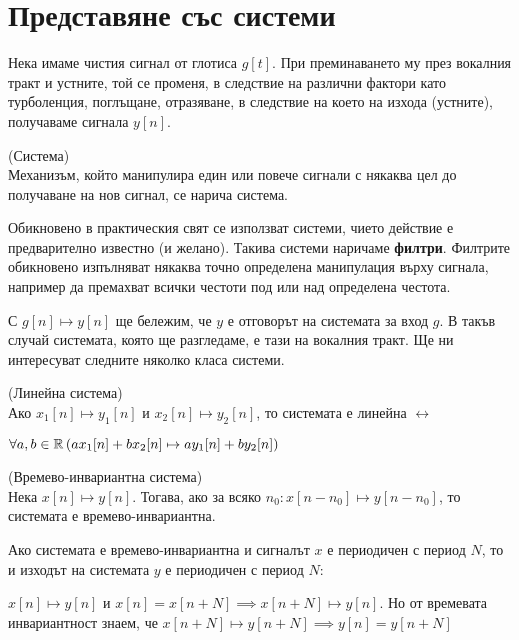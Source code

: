 \documentclass[main.tex]{subfiles}
\begin{document}
\section{Представяне със системи}
Нека имаме чистия сигнал от глотиса $g[t]$. При преминаването му през вокалния тракт и устните, той
се променя, в следствие на различни фактори като турболенция, поглъщане, отразяване, в следствие на което 
на изхода (устните), получаваме сигнала $y[n]$.

\begin{definition*}{(Система)}\\
Механизъм, който манипулира един или повече сигнали с някаква цел до
получаване на нов сигнал, се нарича система.

Обикновено в практическия свят се използват системи, чието действие е предварително известно (и желано). Такива системи
наричаме \textbf{филтри}. Филтрите обикновено изпълняват някаква точно определена манипулация върху сигнала, например
да премахват всички честоти под или над определена честота.
\end{definition*}

С $g[n] \mapsto y[n]$ ще бележим, че $y$ е отговорът на системата за вход $g$. В такъв случай системата, която ще разгледаме, е тази на вокалния тракт. Ще ни интересуват
следните няколко класа системи.

\begin{definition*}{(Линейна система)}\\
    Ако $x_1[n] \mapsto y_1[n]$ и $x_2[n] \mapsto y_2[n]$, то системата е линейна $\longleftrightarrow$

    $\forall a, b \in \mathbb{R} \left(ax_1[n] + bx_2[n] \mapsto ay_1[n] + by_2[n]\right)$ 
\end{definition*}


\begin{definition*}{(Времево-инвариантна система)}\\
    Нека $x[n] \mapsto y[n]$. Тогава, ако за всяко $n_0: x[n - n_0] \mapsto y[n - n_0]$, то
    системата е времево-инвариантна.
\end{definition*}

\begin{property}
\label{systems:periodicity}
Ако системата е времево-инвариантна и сигналът $x$ е периодичен с период $N$,
то и изходът на системата $y$ е периодичен с период $N$:

$x[n] \mapsto y[n]$ и $x[n] = x[n+N] \implies x[n+N] \mapsto y[n]$. Но от времевата инвариантност знаем, че
$x[n+N] \mapsto y[n+N] \implies y[n] = y[n+N]$
\end{property}
\end{document}
